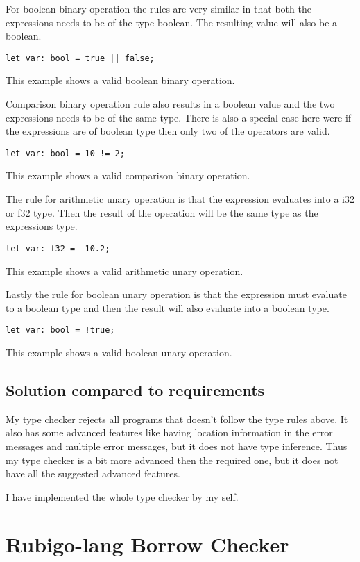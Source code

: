 \documentclass[12pt]{article}
\begin{document}
	For boolean binary operation the rules are very similar in that both the expressions needs to be of the type boolean. The resulting value will also be a boolean.
    	\begin{verbatim}
let var: bool = true || false;
    	\end{verbatim}
	This example shows a valid boolean binary operation.

	Comparison binary operation rule also results in a boolean value and the two expressions needs to be of the same type. There is also a special case here were if the expressions are of boolean type then only two of the operators are valid.
    	\begin{verbatim}
let var: bool = 10 != 2;
    	\end{verbatim}
	This example shows a valid comparison binary operation.
	

	The rule for arithmetic unary operation is that the expression evaluates into a i32 or f32 type. Then the result of the operation will be the same type as the expressions type.
    	\begin{verbatim}
let var: f32 = -10.2;
    	\end{verbatim}
	This example shows a valid arithmetic unary operation.

	Lastly the rule for boolean unary operation is that the expression must evaluate to a boolean type and then the result will also evaluate into a boolean type.
    	\begin{verbatim}
let var: bool = !true;
    	\end{verbatim}
	This example shows a valid boolean unary operation.


	\subsection{Solution compared to requirements}
		My type checker rejects all programs that doesn't follow the type rules above. It also has some advanced features like having location information in the error messages and multiple error messages, but it does not have type inference. Thus my type checker is a bit more advanced then the required one, but it does not have all the suggested advanced features.

		I have implemented the whole type checker by my self.



    \section{Rubigo-lang Borrow Checker}	
\end{document}

